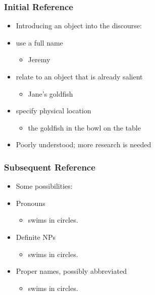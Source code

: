\documentclass[compress,color=usenames]{beamer}
\begin{document}
\begin{frame}
\frametitle{
Initial Reference}

\label{f11}
\begin{itemize}
\item {{Introducing an object into the discourse:}}
\item {{use a full name}}
\begin{itemize}
\item Jeremy
\end{itemize}
\item {{relate to an object that is already salient}}
\begin{itemize}
\item Jane's goldfish
\end{itemize}
\item {{specify physical location}}
\begin{itemize}
\item the goldfish in the bowl on the table
\end{itemize}
\item {{Poorly understood; more research is needed}}
\end{itemize}
\end{frame}

\begin{frame}
\frametitle{
Subsequent Reference}

\label{f13}
\begin{itemize}
\item {{Some possibilities:}}
\item {{Pronouns}}
\begin{itemize}
\item {} swims in circles.
\end{itemize}
\item {{Definite NPs}}
\begin{itemize}
\item {} swims in circles.
\end{itemize}
\item {{Proper names, possibly abbreviated}}
\begin{itemize}
\item {} swims in circles.
\end{itemize}
\end{itemize}
\end{frame}
\end{document}
